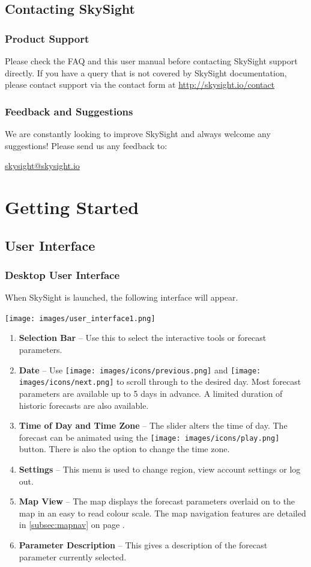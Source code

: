 \documentclass[11pt,a4paper]{article}
\begin{document}
\subsection{Contacting SkySight}
\subsubsection{Product Support}
Please check the FAQ and this user manual before contacting SkySight support directly. If you have a query that is not covered by SkySight documentation, please contact support via the contact form at \url{http://skysight.io/contact}
\subsubsection{Feedback and Suggestions}
We are constantly looking to improve SkySight and always welcome any suggestions! Please send us any feedback to: 
\begin{flushleft}
\url{skysight@skysight.io}
\end{flushleft}
\section{Getting Started}
\subsection{User Interface}
\subsubsection{Desktop User Interface}
When SkySight is launched, the following interface will appear.
\begin{center}
\texttt{[image: images/user\_interface1.png]}
\end{center}
\begin{enumerate}
\item \textbf{Selection Bar} -- Use this to select the interactive tools or forecast parameters.
\item \textbf{Date}  -- Use \texttt{[image: images/icons/previous.png]} and \texttt{[image: images/icons/next.png]}  to scroll through to the desired day. Most forecast parameters are available up to 5 days in advance. A limited duration of historic forecasts are also available.
\item \textbf{Time of Day and Time Zone} -- The slider alters the time of day. The forecast can be animated using the \texttt{[image: images/icons/play.png]} button. There is also the option to change the time zone.
\item \textbf{Settings} -- This menu is used to change region, view account settings or log out.
\item \textbf{Map View} -- The map displays the forecast parameters overlaid on to the map in an easy to read colour scale. The map navigation features are detailed in \ref{subsec:mapnav} on page \pageref{subsec:mapnav}.
\item \textbf{Parameter Description} -- This gives a description of the forecast parameter currently selected.
\end{enumerate}
\end{document}
